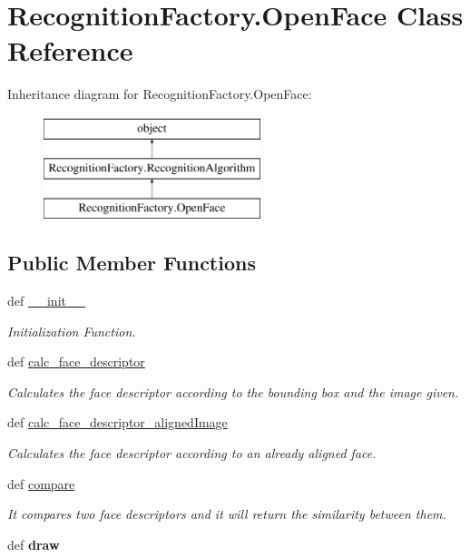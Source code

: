 \hypertarget{classRecognitionFactory_1_1OpenFace}{\section{Recognition\-Factory.\-Open\-Face Class Reference}
\label{classRecognitionFactory_1_1OpenFace}
}
Inheritance diagram for Recognition\-Factory.\-Open\-Face\-:\begin{figure}[H]
\begin{center}
\leavevmode
\includegraphics[height=3.000000cm]{classRecognitionFactory_1_1OpenFace}
\end{center}
\end{figure}
\subsection*{Public Member Functions}
\begin{DoxyCompactItemize}
\item 
def \hyperlink{classRecognitionFactory_1_1OpenFace_af5f05c3d9119fa84eebe93af73294b71}{\-\_\-\-\_\-init\-\_\-\-\_\-}
\begin{DoxyCompactList}\small\item\em Initialization Function. \end{DoxyCompactList}\item 
def \hyperlink{classRecognitionFactory_1_1OpenFace_ae2ba0907a6d7821c453e122e96098fbb}{calc\-\_\-face\-\_\-descriptor}
\begin{DoxyCompactList}\small\item\em Calculates the face descriptor according to the bounding box and the image given. \end{DoxyCompactList}\item 
def \hyperlink{classRecognitionFactory_1_1OpenFace_a4dbaec1d0973561a3c145126ad9d62f8}{calc\-\_\-face\-\_\-descriptor\-\_\-aligned\-Image}
\begin{DoxyCompactList}\small\item\em Calculates the face descriptor according to an already aligned face. \end{DoxyCompactList}\item 
def \hyperlink{classRecognitionFactory_1_1OpenFace_a9e1aaa6fa364059d3ce1d27b2b500e38}{compare}
\begin{DoxyCompactList}\small\item\em It compares two face descriptors and it will return the similarity between them. \end{DoxyCompactList}\item 
\hypertarget{classRecognitionFactory_1_1OpenFace_a1084253f0b1ab36ae62ebd9a5b8c4b09}{def {\bfseries draw}}\label{classRecognitionFactory_1_1OpenFace_a1084253f0b1ab36ae62ebd9a5b8c4b09}

\end{DoxyCompactItemize}
